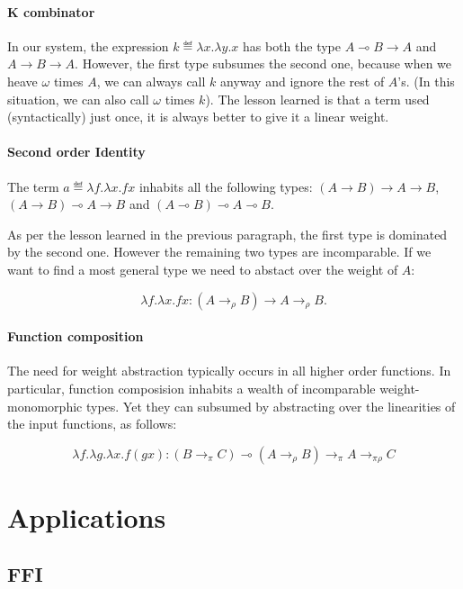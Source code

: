 \documentclass[11pt]{article}
\begin{document}
\paragraph{K combinator}

In our system, the expression $k ≝ λx. λy. x$ has both the type
$A ⊸ B → A$ and $A → B → A$. However, the first type subsumes the
second one, because when we heave $ω$ times $A$, we can always call
$k$ anyway and ignore the rest of $A$'s. (In this situation, we can
also call $ω$ times $k$). The lesson learned is that a term used
(syntactically) just once, it is always better to give it a linear
weight.

\paragraph{Second order Identity}

The term $a ≝ λf.λx.f x$ inhabits all the following types:
$(A → B) → A → B$,
$(A → B) ⊸ A → B$ and
$(A ⊸ B) ⊸ A ⊸ B$.

As per the lesson learned in the previous paragraph, the first type is
dominated by the second one. However the remaining two types are
incomparable. If we want to find a most general type we need to
abstact over the weight of $A$:

\[ λf.λx.f x : (A →_ρ B) → A →_ρ B.\]


\paragraph{Function composition}
The need for weight abstraction typically occurs in all higher order
functions.  In particular, function composision inhabits a wealth of
incomparable weight-monomorphic types. Yet they can subsumed by
abstracting over the linearities of the input functions, as follows:

\[ λf. λg. λx. f (g x) : (B →_π C) ⊸ (A →_ρ B) →_π A →_{πρ} C\]


\section{Applications}
\label{sec:ghc}

\subsection{FFI}
\label{sec:ffi}
\end{document}
